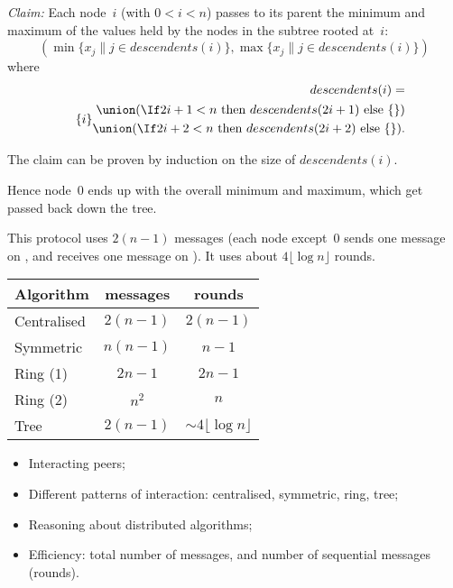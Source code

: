 \documentclass[notes,color]{sepslide0}
\def\set#1{\{#1\}}
\begin{document}
\begin{slide}

\emph{Claim:} Each node~$i$ (with $0<i<n$) passes to its parent the minimum
and maximum of the values held by the nodes in the subtree rooted at~$i$:
%
\[
(\min \set{x_j \| j \in descendents(i)}, \max \set{x_j \| j \in descendents(i)})
\]
where
\[
\begin{align}
descendents(i) = \\
\quad
  \set{i} 
    \begin{align}
      \null \union (\If 2i+1<n \mbox{ then } descendents(2i+1) 
      \mbox{ else } \set{}) \\
      \null \union
      (\If 2i+2<n  \mbox{ then }  descendents(2i+2) \mbox{ else } \set{}).
    \end{align}
\end{align}
\]

The claim can be proven by induction on the size of $descendents(i)$.

Hence node~$0$ ends up with the overall minimum and maximum, which get passed
back down the tree.
\end{slide}


\begin{slide}

This protocol uses $2(n-1)$ messages (each node except~0 sends one message on
, and receives one message on ).  It uses about
$4\lfloor \log n \rfloor$ rounds.
\end{slide}


\begin{slide}

\begin{tabular}{lcc}
Algorithm & messages & rounds \\
\hline
Centralised & $2(n-1)$ & $2(n-1)$ \\
Symmetric & $n(n-1)$ & $n-1$ \\
Ring (1) & $2n-1$ & $2n-1$ \\
Ring (2) & $n^2$ & $n$ \\
Tree & $2(n-1)$ & $\sim 4\lfloor \log n \rfloor$
\end{tabular}
\end{slide}


\begin{slide}

\begin{itemize}
\item
Interacting peers;

\item
Different patterns of interaction: centralised, symmetric, ring, tree;

\item
Reasoning about distributed algorithms;

\item
Efficiency: total number of messages, and number of sequential messages
(rounds).
\end{itemize}
\end{slide}
\end{document}
